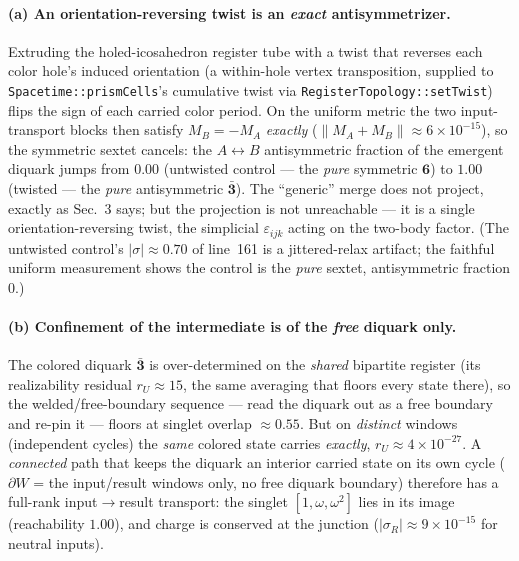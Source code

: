 \documentclass[11pt]{article}
\theoremstyle{definition}
\newcommand{\rep}[1]{\mathbf{#1}}      %
\newcommand{\sigmacol}{\sigma}         %
\begin{document}
\paragraph{(a) An orientation-reversing twist is an \emph{exact} antisymmetrizer.}
Extruding the holed-icosahedron register tube with a twist that reverses each color
hole's induced orientation (a within-hole vertex transposition, supplied to
\texttt{Spacetime::prismCells}'s cumulative twist via
\texttt{RegisterTopology::setTwist}) flips the sign of each carried color period.
On the uniform metric the two input-transport blocks then satisfy $M_B=-M_A$
\emph{exactly} ($\lVert M_A+M_B\rVert\approx 6\times10^{-15}$), so the symmetric
sextet cancels: the $A\leftrightarrow B$ antisymmetric fraction of the emergent
diquark jumps from $0.00$ (untwisted control --- the \emph{pure} symmetric $\rep 6$)
to $1.00$ (twisted --- the \emph{pure} antisymmetric $\bar{\rep 3}$). The
``generic'' merge does not project, exactly as Sec.~3 says; but the projection is
not unreachable --- it is a single orientation-reversing twist, the simplicial
$\varepsilon_{ijk}$ acting on the two-body factor. (The untwisted control's
$|\sigmacol|\approx0.70$ of line~161 is a jittered-relax artifact; the faithful
uniform measurement shows the control is the \emph{pure} sextet, antisymmetric
fraction $0$.)

\paragraph{(b) Confinement of the intermediate is of the \emph{free} diquark only.}
The colored diquark $\bar{\rep 3}$ is over-determined on the \emph{shared} bipartite
register (its realizability residual $r_U\approx 15$, the same averaging that floors
every state there), so the welded/free-boundary sequence --- read the diquark out as
a free boundary and re-pin it --- floors at singlet overlap $\approx 0.55$. But on
\emph{distinct} windows (independent cycles) the \emph{same} colored state carries
\emph{exactly}, $r_U\approx 4\times10^{-27}$. A \emph{connected} path that keeps the
diquark an interior carried state on its own cycle ($\partial W$ = the input/result
windows only, no free diquark boundary) therefore has a full-rank input$\to$result
transport: the singlet $[1,\omega,\omega^2]$ lies in its image (reachability
$1.00$), and charge is conserved at the junction ($|\sigmacol_R|\approx 9\times
10^{-15}$ for neutral inputs).
\end{document}
